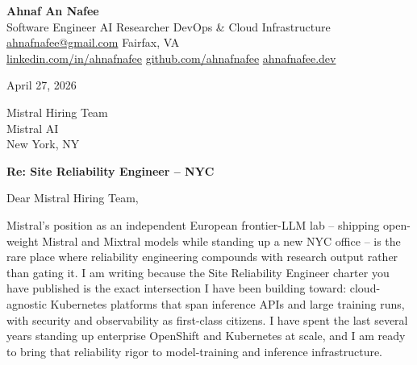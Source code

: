 \documentclass[letterpaper,11pt]{article}
\begin{document}
\begin{center}
  {\LARGE\bfseries\color{accent} Ahnaf An Nafee}\\[3pt]
  {\small Software Engineer \textbar{} AI Researcher \textbar{} DevOps \& Cloud Infrastructure}\\[4pt]
  \small
  \href{mailto:ahnafnafee@gmail.com}{ahnafnafee@gmail.com} \textbar{}
  Fairfax, VA\\
  \href{https://linkedin.com/in/ahnafnafee}{linkedin.com/in/ahnafnafee} \textbar{}
  \href{https://github.com/ahnafnafee}{github.com/ahnafnafee} \textbar{}
  \href{https://www.ahnafnafee.dev}{ahnafnafee.dev}
\end{center}

\vspace{20pt}

April 27, 2026

Mistral Hiring Team\\Mistral AI\\New York, NY

\textbf{Re: Site Reliability Engineer -- NYC}

Dear Mistral Hiring Team,

Mistral's position as an independent European frontier-LLM lab -- shipping open-weight Mistral and Mixtral models while standing up a new NYC office -- is the rare place where reliability engineering compounds with research output rather than gating it. I am writing because the Site Reliability Engineer charter you have published is the exact intersection I have been building toward: cloud-agnostic Kubernetes platforms that span inference APIs and large training runs, with security and observability as first-class citizens. I have spent the last several years standing up enterprise OpenShift and Kubernetes at scale, and I am ready to bring that reliability rigor to model-training and inference infrastructure.
\end{document}
